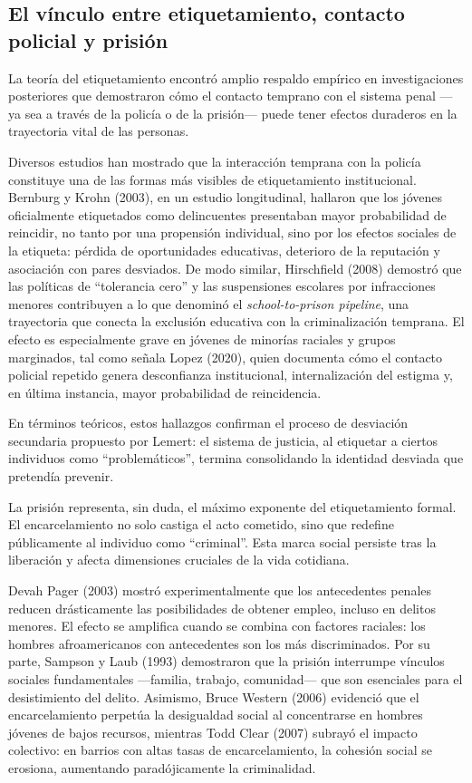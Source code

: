\documentclass[
  spanish,
  letterpaper,
  DIV=11,
  numbers=noendperiod]{scrreprt}
\begin{document}
\subsection{El vínculo entre etiquetamiento, contacto policial y
prisión}\label{el-vuxednculo-entre-etiquetamiento-contacto-policial-y-prisiuxf3n}

La teoría del etiquetamiento encontró amplio respaldo empírico en
investigaciones posteriores que demostraron cómo el contacto temprano
con el sistema penal ---ya sea a través de la policía o de la prisión---
puede tener efectos duraderos en la trayectoria vital de las personas.

Diversos estudios han mostrado que la interacción temprana con la
policía constituye una de las formas más visibles de etiquetamiento
institucional. Bernburg y Krohn (2003), en un estudio longitudinal,
hallaron que los jóvenes oficialmente etiquetados como delincuentes
presentaban mayor probabilidad de reincidir, no tanto por una propensión
individual, sino por los efectos sociales de la etiqueta: pérdida de
oportunidades educativas, deterioro de la reputación y asociación con
pares desviados. De modo similar, Hirschfield (2008) demostró que las
políticas de ``tolerancia cero'' y las suspensiones escolares por
infracciones menores contribuyen a lo que denominó el
\emph{school-to-prison pipeline}, una trayectoria que conecta la
exclusión educativa con la criminalización temprana. El efecto es
especialmente grave en jóvenes de minorías raciales y grupos marginados,
tal como señala Lopez (2020), quien documenta cómo el contacto policial
repetido genera desconfianza institucional, internalización del estigma
y, en última instancia, mayor probabilidad de reincidencia.

En términos teóricos, estos hallazgos confirman el proceso de desviación
secundaria propuesto por Lemert: el sistema de justicia, al etiquetar a
ciertos individuos como ``problemáticos'', termina consolidando la
identidad desviada que pretendía prevenir.

La prisión representa, sin duda, el máximo exponente del etiquetamiento
formal. El encarcelamiento no solo castiga el acto cometido, sino que
redefine públicamente al individuo como ``criminal''. Esta marca social
persiste tras la liberación y afecta dimensiones cruciales de la vida
cotidiana.

Devah Pager (2003) mostró experimentalmente que los antecedentes penales
reducen drásticamente las posibilidades de obtener empleo, incluso en
delitos menores. El efecto se amplifica cuando se combina con factores
raciales: los hombres afroamericanos con antecedentes son los más
discriminados. Por su parte, Sampson y Laub (1993) demostraron que la
prisión interrumpe vínculos sociales fundamentales ---familia, trabajo,
comunidad--- que son esenciales para el desistimiento del delito.
Asimismo, Bruce Western (2006) evidenció que el encarcelamiento perpetúa
la desigualdad social al concentrarse en hombres jóvenes de bajos
recursos, mientras Todd Clear (2007) subrayó el impacto colectivo: en
barrios con altas tasas de encarcelamiento, la cohesión social se
erosiona, aumentando paradójicamente la criminalidad.
\end{document}
